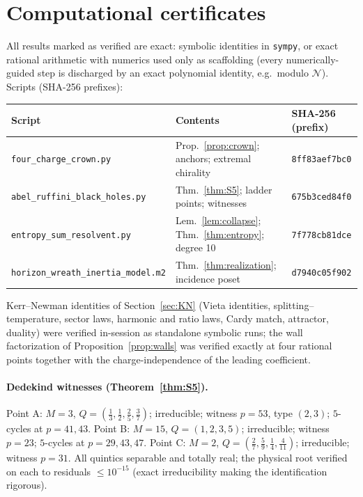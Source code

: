 \documentclass[11pt]{article}
\theoremstyle{definition}
\theoremstyle{remark}
\begin{document}
\appendix
\section{Computational certificates}
\label{app:certs}

All results marked as verified are exact: symbolic identities in
\texttt{sympy}, or exact rational arithmetic with numerics used only as
scaffolding (every numerically-guided step is discharged by an exact
polynomial identity, e.g.\ modulo $\mathcal N$). Scripts (SHA-256 prefixes):

\begin{center}
\begin{tabular}{@{}lll@{}}
\toprule
Script & Contents & SHA-256 (prefix)\\
\midrule
\texttt{four\_charge\_crown.py} &
Prop.~\ref{prop:crown}; anchors; extremal chirality &
\texttt{8ff83aef7bc0}\\
\texttt{abel\_ruffini\_black\_holes.py} &
Thm.~\ref{thm:S5}; ladder points; witnesses &
\texttt{675b3ced84f0}\\
\texttt{entropy\_sum\_resolvent.py} &
Lem.~\ref{lem:collapse}; Thm.~\ref{thm:entropy}; degree 10 &
\texttt{7f778cb81dce}\\
\texttt{horizon\_wreath\_inertia\_model.m2} &
Thm.~\ref{thm:realization}; incidence poset &
\texttt{d7940c05f902}\\
\bottomrule
\end{tabular}
\end{center}

\noindent Kerr--Newman identities of Section~\ref{sec:KN} (Vieta identities,
splitting--temperature, sector laws, harmonic and ratio laws, Cardy match,
attractor, duality) were verified in-session as standalone symbolic runs; the
wall factorization of Proposition~\ref{prop:walls} was verified exactly at
four rational points together with the charge-independence of the leading
coefficient.

\paragraph{Dedekind witnesses (Theorem~\ref{thm:S5}).}
Point A: $M=3$, $Q=(\frac13,\frac12,\frac25,\frac37)$; irreducible; witness
$p=53$, type $(2,3)$; $5$-cycles at $p=41,43$. Point B: $M=15$, $Q=(1,2,3,5)$;
irreducible; witness $p=23$; $5$-cycles at $p=29,43,47$. Point C: $M=2$,
$Q=(\frac27,\frac59,\frac14,\frac4{11})$; irreducible; witness $p=31$.
All quintics separable and totally real; the physical root verified on each to
residuals $\le10^{-15}$ (exact irreducibility making the identification
rigorous).
\end{document}
